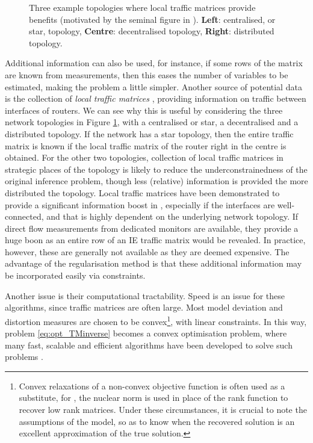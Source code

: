 \begin{figure}[ht]
\Topology
\caption{Three example topologies where local traffic matrices provide
  benefits (motivated by the seminal figure in
  \cite{baran64:_distr}). \textbf{Left}: centralised, or star,
  topology, \textbf{Centre}: decentralised topology, \textbf{Right}:
  distributed topology.}
\label{fig:topology}
\end{figure}


Additional information can also be used, for instance, if some rows of
the matrix are known from measurements, then this eases the number of
variables to be estimated, making the problem a little simpler.
Another source of potential data is the collection of \textit{local
  traffic matrices} \cite{Varghese03Measure}, providing information on
traffic between interfaces of routers. We can see why this is useful
by considering the three network topologies in Figure
\ref{fig:topology}, with a centralised or star, a decentralised and a
distributed topology. If the network has a star topology, then the
entire traffic matrix is known if the local traffic matrix of the
router right in the centre is obtained. For the other two topologies,
collection of local traffic matrices in strategic places of the
topology is likely to reduce the underconstrainedness of the original
inference problem, though less (relative) information is provided the
more distributed the topology.  Local traffic matrices have been
demonstrated to provide a significant information boost in
\cite{Zhang03InfoSIGCOMM}, especially if the interfaces are
well-connected, and that is highly dependent on the underlying network
topology. If direct flow measurements from dedicated monitors are
available, they provide a huge boon as an entire row of an IE traffic
matrix would be revealed. In practice, however, these are generally
not available as they are deemed expensive. The advantage of the
regularisation method is that these additional information may be
incorporated easily via constraints.

Another issue is their computational tractability. Speed is an issue
for these algorithms, since traffic matrices are often large. Most
model deviation and distortion measures are chosen to be 
convex\footnote{Convex relaxations of a non-convex objective function is often
used as a substitute, for \eg, the nuclear norm is used in place of the rank function
to recover low rank matrices. Under these circumstances, it is crucial to 
note the assumptions of the model, so as to know when the recovered solution
is an excellent approximation of the true solution.}, with
linear constraints. In this way, problem \eqref{eq:opt_TMinverse} becomes a
convex optimisation problem, where many fast, scalable and efficient algorithms
have been developed to solve such problems \cite{Boyd04Opt}.

